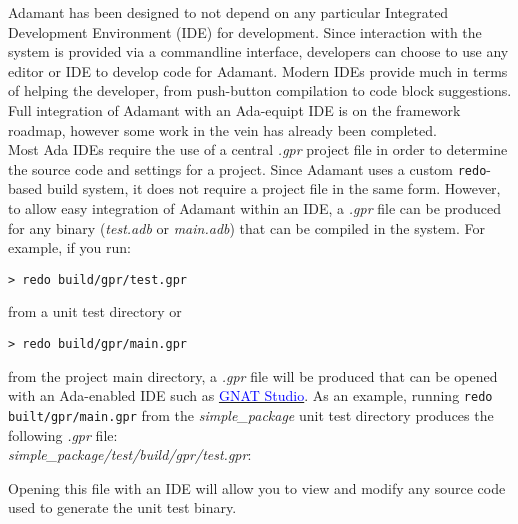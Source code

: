 Adamant has been designed to not depend on any particular Integrated Development Environment (IDE) for development. Since interaction with the system is provided via a commandline interface, developers can choose to use any editor or IDE to develop code for Adamant. Modern IDEs provide much in terms of helping the developer, from push-button compilation to code block suggestions. Full integration of Adamant with an Ada-equipt IDE is on the framework roadmap, however some work in the vein has already been completed. \\

Most Ada IDEs require the use of a central \textit{.gpr} project file in order to determine the source code and settings for a project. Since Adamant uses a custom \texttt{redo}-based build system, it does not require a project file in the same form. However, to allow easy integration of Adamant within an IDE, a \textit{.gpr} file can be produced for any binary (\textit{test.adb} or \textit{main.adb}) that can be compiled in the system. For example, if you run:

\vspace{5mm} %
\begin{verbatim}
> redo build/gpr/test.gpr
\end{verbatim}
\vspace{5mm} %

from a unit test directory or 

\vspace{5mm} %
\begin{verbatim}
> redo build/gpr/main.gpr
\end{verbatim}
\vspace{5mm} %

from the project main directory, a \textit{.gpr} file will be produced that can be opened with an Ada-enabled IDE such as \href{https://docs.adacore.com/live/wave/gps/html/gps_ug/index.html}{\textcolor{blue}{GNAT Studio}}. As an example, running \texttt{redo built/gpr/main.gpr} from the \textit{simple\_package} unit test directory produces the following \textit{.gpr} file: \\

\textit{simple\_package/test/build/gpr/test.gpr}:

Opening this file with an IDE will allow you to view and modify any source code used to generate the unit test binary.

